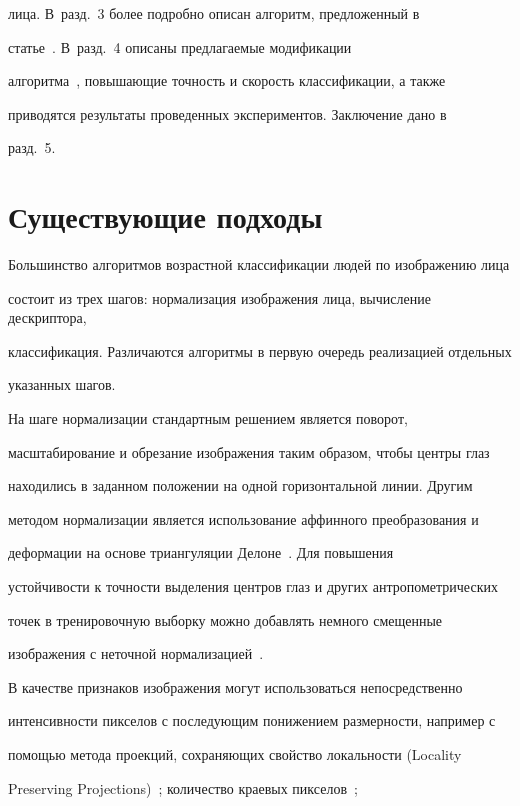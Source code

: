 лица. В~разд.~3 более подробно описан алгоритм, предложенный в

статье~\cite{5-r}. В~разд.~4 описаны предлагаемые модификации

алгоритма~\cite{5-r}, повышающие точность и скорость классификации, а также

приводятся результаты проведенных экспериментов. Заключение дано в

разд.~5.



\section{Существующие подходы}



Большинство алгоритмов возрастной классификации людей по изображению лица

состоит из трех шагов: нормализация изображения лица, вычисление дескриптора,

классификация. Различаются алгоритмы в первую очередь реализацией отдельных

указанных шагов.



На шаге нормализации стандартным решением является поворот,

масштабирование и обрезание изображения таким образом, чтобы центры глаз

находились в заданном положении на одной горизонтальной линии. Другим

методом нормализации является использование аффинного преобразования и

деформации на основе триангуляции Делоне~\cite{18-r}. Для повышения

устойчивости к точности выделения центров глаз и других антропометрических

точек в тренировочную выборку можно добавлять немного смещенные

изображения с неточной нормализацией~\cite{13-r}.



В качестве признаков изображения могут использоваться непосредственно

интенсивности пикселов с последующим понижением размерности, например с

помощью метода проекций, сохраняющих свойство локальности (Locality

Preserving Projections)~\cite{7-r}; количество краевых пикселов~\cite{15-r};


